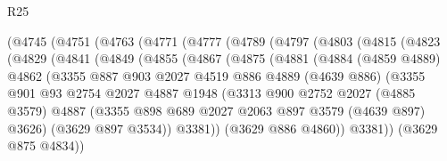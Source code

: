 \begin{lexlean}{R25}
\begin{coremodule}
        (@4745
          (@4751
            (@4763
              (@4771
                (@4777
                  (@4789
                    (@4797
                      (@4803
                        (@4815
                          (@4823
                            (@4829
                              (@4841
                                (@4849
                                  (@4855
                                    (@4867
                                      (@4875
                                        (@4881
                                          (@4884
                                            (@4859 @4889)
                                            @4862
                                            (@3355
                                              @887
                                              @903
                                              @2027
                                              @4519
                                              @886
                                              @4889
                                              (@4639 @886)
                                              (@3355
                                                @901
                                                @93
                                                @2754
                                                @2027
                                                @4887
                                                @1948
                                                (@3313
                                                  @900
                                                  @2752
                                                  @2027
                                                  (@4885 @3579)
                                                  @4887
                                                  (@3355
                                                    @898
                                                    @689
                                                    @2027
                                                    @2063
                                                    @897
                                                    @3579
                                                    (@4639 @897)
                                                    @3626)
                                                  (@3629 @897 @3534))
                                                @3381))
                                            (@3629 @886 @4860))
                                          @3381))
                                      (@3629 @875 @4834))

\end{coremodule}
\end{lexlean}

